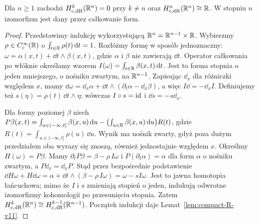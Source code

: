 \begin{twierdzenie}
\label{thm:compact-Rn-v11}
Dla $n\ge1$ zachodzi
$H_{c,\mathrm{dR}}^k(\mathbb{R}^n)=0$ przy $k\ne n$ oraz
$H_{c,\mathrm{dR}}^n(\mathbb{R}^n)\cong\mathbb{R}$.
W stopniu $n$ izomorfizm jest dany przez całkowanie form.
\end{twierdzenie}
\begin{proof}
Przedstawimy indukcję wykorzystującą $\mathbb{R}^n=\mathbb{R}^{n-1}\times\mathbb{R}$.
Wybierzmy $\rho\in C_c^\infty(\mathbb{R})$ o
$\int_{t\in\mathbb{R}}\rho(t)\,\mathrm d t=1$.
Rozłóżmy formę w sposób jednoznaczny:
$\omega=\alpha(x,t)+\dd t\wedge\beta(x,t)$,
gdzie $\alpha$ i $\beta$ nie zawierają $\dd t$.
Operator całkowania po włóknie określamy wzorem
$I(\omega)=\int_{t\in\mathbb{R}}\beta(x,t)\,\mathrm d t$.
Jest to forma stopnia o jeden mniejszego, o nośniku zwartym,
na $\mathbb{R}^{n-1}$. Zapisując $\dd_x$ dla różniczki względem $x$,
mamy
$\dd\omega=\dd_x\alpha+\dd t\wedge
(\partial_t\alpha-\dd_x\beta)$, a więc
$I\dd=-\dd_x I$. Definiujemy też
$s(\eta)=\rho(t)\,\dd t\wedge\eta$;
wówczas $I\circ s=\mathrm{id}$ i $\dd s=-s\dd_x$.

Dla formy poziomej $\beta$ niech
$P\beta(x,t)=\int_{u\in(-\infty,t]}\beta(x,u)\,\mathrm d u-
\bigl(\int_{u\in\mathbb{R}}\beta(x,u)\,\mathrm d u\bigr)R(t)$,
gdzie $R(t)=\int_{u\in(-\infty,t]}\rho(u)\,\dd u$.
Wynik ma nośnik zwarty, gdyż poza dużym przedziałem
oba wyrazy się znoszą, również jednostajnie względem $x$.
Określmy $H(\omega)=P\beta$. Mamy
$\partial_t P\beta=\beta-\rho\,I\omega$ i
$P(\partial_t\alpha)=\alpha$ dla form $\alpha$ o
nośniku zwartym, a $P\dd_x=\dd_xP$.
Stąd przez bezpośrednie podstawienie
$\dd H\omega+H\dd\omega=
\alpha+\dd t\wedge(\beta-\rho\,I\omega)
=\omega-sI\omega$.
Jest to jawna homotopia łańcuchowa; mimo że $I$ i $s$
zmieniają stopień o jeden, indukują odwrotne
izomorfizmy kohomologii po przesunięciu stopnia. Zatem
$H_{c,\mathrm{dR}}^k(\mathbb{R}^n)\cong
H_{c,\mathrm{dR}}^{k-1}(\mathbb{R}^{n-1})$.
Początek indukcji daje Lemat~\ref{lem:compact-R-v11}.
\end{proof}

